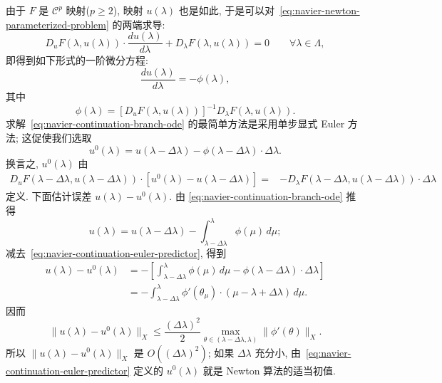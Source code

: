 由于 $F$ 是 $\mathcal C^p$ 映射($p\geq2$), 映射 $u(\lambda)$ 也是如此,
于是可以对 \,\eqref{eq:navier-newton-parameterized-problem} 的两端求导:
\begin{equation}
\label{eq:navier-continuation-differentiated-branch}
D_uF(\lambda,u(\lambda))\mathbin{\cdot}\frac{du(\lambda)}{d\lambda}
+D_\lambda F(\lambda,u(\lambda))=0
\qquad\forall\lambda\in\Lambda,
\end{equation}
即得到如下形式的一阶微分方程:
\begin{equation}
\label{eq:navier-continuation-branch-ode}
\frac{du(\lambda)}{d\lambda}=-\phi(\lambda),
\end{equation}
其中
\[
\phi(\lambda)=[D_uF(\lambda,u(\lambda))]^{-1}
D_\lambda F(\lambda,u(\lambda)).
\]
求解 \,\eqref{eq:navier-continuation-branch-ode} 的最简单方法是采用单步显式 Euler 方法;
这促使我们选取
\begin{equation}
\label{eq:navier-continuation-euler-predictor}
u^0(\lambda)=u(\lambda-\Delta\lambda)
-\phi(\lambda-\Delta\lambda)\mathbin{\cdot}\Delta\lambda.
\end{equation}
换言之, $u^0(\lambda)$ 由
\begin{equation}
\label{eq:navier-continuation-predictor-linear-system}
\begin{aligned}
D_uF(\lambda-\Delta\lambda,u(\lambda-\Delta\lambda))
\mathbin{\cdot}[u^0(\lambda)-u(\lambda-\Delta\lambda)]
={}&-D_\lambda F(\lambda-\Delta\lambda,u(\lambda-\Delta\lambda))
\mathbin{\cdot}\Delta\lambda
\end{aligned}
\end{equation}
定义. 下面估计误差 $u(\lambda)-u^0(\lambda)$. 由
\eqref{eq:navier-continuation-branch-ode} 推得
\[
u(\lambda)=u(\lambda-\Delta\lambda)
-\int_{\lambda-\Delta\lambda}^{\lambda}\phi(\mu)\,d\mu;
\]
减去 \,\eqref{eq:navier-continuation-euler-predictor}, 得到
\[
\begin{aligned}
u(\lambda)-u^0(\lambda)
&=-\left[\int_{\lambda-\Delta\lambda}^{\lambda}\phi(\mu)\,d\mu
-\phi(\lambda-\Delta\lambda)\mathbin{\cdot}\Delta\lambda\right]\\
&=-\int_{\lambda-\Delta\lambda}^{\lambda}
\phi'(\theta_\mu)\mathbin{\cdot}(\mu-\lambda+\Delta\lambda)\,d\mu.
\end{aligned}
\]
因而
\[
\|u(\lambda)-u^0(\lambda)\|_X
\leq\frac{(\Delta\lambda)^2}{2}
\max_{\theta\in(\lambda-\Delta\lambda,\lambda)}\|\phi'(\theta)\|_X.
\]
所以 $\|u(\lambda)-u^0(\lambda)\|_X$ 是 $O((\Delta\lambda)^2)$; 如果
$\Delta\lambda$ 充分小, 由 \,\eqref{eq:navier-continuation-euler-predictor} 定义的
$u^0(\lambda)$ 就是 Newton 算法的适当初值.

